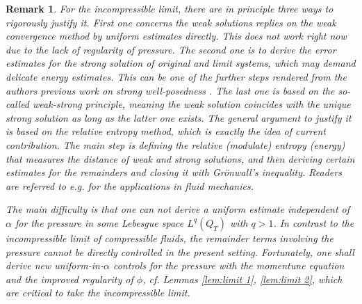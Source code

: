 \documentclass[reqno,a4paper,11pt]{amsart}
\theoremstyle{plain}
\newtheorem{remark}[theorem]{Remark}
\numberwithin{equation}{section}
\begin{document}

\begin{remark}
	\label{rem:incompressible-limit}
	For the incompressible limit, there are in principle three ways to rigorously justify it. First one concerns the weak solutions replies on the weak convergence method by uniform estimates directly. This does not work right now due to the lack of regularity of pressure. The second one is to derive the error estimates for the strong solution of original and limit systems, which may demand delicate energy estimates. This can be one of the further steps rendered from the authors previous work on strong well-posedness \cite{FFHL2024}. The last one is based on the so-called \textit{weak-strong principle}, meaning the weak solution coincides with the unique strong solution as long as the latter one exists. The general argument to justify it is based on the \textit{relative entropy method}, which is exactly the idea of current contribution. The main step is defining the \textit{relative (modulate) entropy (energy)} that measures the distance of weak and strong solutions, and then deriving certain estimates for the remainders and closing it with Gr\"onwall's inequality. Readers are referred to e.g. \cite{ALN2024,FJN,FLN,FPP} for the applications in fluid mechanics.
	
	The main difficulty is that one can not derive a uniform estimate independent of $\alpha$ for the pressure in some Lebesgue space $L^q(Q_T)$ with $q > 1$. In contrast to the incompressible limit of compressible fluids, the remainder terms involving the pressure cannot be directly controlled in the present setting. Fortunately, one shall derive new uniform-in-$\alpha$ controls for the pressure with the momentune equation and the improved regularity of $\phi$, cf. Lemmas \ref{lem:limit 1}, \ref{lem:limit 2}, which are critical to take the incompressible limit.
\end{remark}
\end{document}
